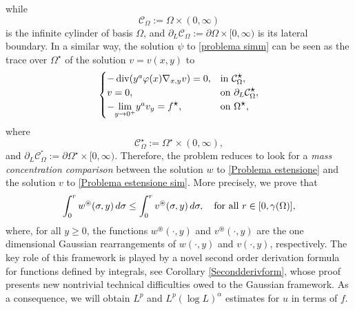 \documentclass[a4paper,10pt,reqno]{amsart}
\numberwithin{equation}{section}
\begin{document}
while
\[
\mathcal{C}_{\Omega}:=\Omega\times(0,\infty)
\]
is the infinite cylinder of basis $\Omega$, and
$\partial_{L}\mathcal{C}_{\Omega}:=\partial\Omega\times[0,\infty)$ is its lateral boundary.
In a similar way, the solution $\psi$ to \eqref{problema simm} can be seen as
the trace over $\Omega^{\displaystyle\star}$ of the solution $v=v(x,y)$ to
\begin{equation}\label{Problema estensione sim}
\begin{cases}
-\operatorname{div}(y^a\varphi(x)\nabla_{x,y}v)=0, &\hbox{in}~\mathcal{C}_{\Omega}^{\displaystyle\star},\\
v=0,&\hbox{on}~\partial_{L}\mathcal{C}_{\Omega}^{\displaystyle\star},\\
-\underset{y\rightarrow0^{+}}{\lim}y^av_y=f^{\displaystyle\star},&\hbox{on}~\Omega^{\displaystyle\star},
\end{cases}
\end{equation}
where
\begin{equation}\label{eq:Steiner symmetrization}
\mathcal{C}_{\Omega}^{\displaystyle\star}:=\Omega^{\displaystyle\star}\times(0,\infty),
\end{equation}
and $\partial_{L}\mathcal{C}_{\Omega
}^{^{\displaystyle\star}}:=\partial\Omega^{\displaystyle\star}\times[0,\infty)$.
Therefore, the problem reduces to look for a \emph{mass concentration
comparison} between the solution $w$ to \eqref{Problema estensione} and the solution $v$ to
\eqref{Problema estensione sim}. More precisely, we prove that
\begin{equation}
\int_{0}^rw^{\circledast}(\sigma,y)\,d\sigma\leq \int_{0}^rv^{\circledast}(\sigma,y)\,d\sigma,
\quad\hbox{for all}~r\in[0,\gamma(\Omega)],\label{concineq}
\end{equation}
where, for all $y\geq0$, the functions $w^{\circledast}(\cdot,y)$ and
$v^{\circledast}(\cdot,y)$ are the one dimensional Gaussian rearrangements
of $w(\cdot,y)$ and $v(\cdot,y)$, respectively. The key role of this framework
is played by a novel second order derivation formula
for functions defined by integrals, see Corollary \ref{Secondderivform}, whose proof presents new nontrivial technical difficulties owed to the Gaussian
framework.
As a consequence, we will obtain $L^p$ and $L^p(\log L)^\alpha$ estimates for $u$ in terms of $f$.
\end{document}

